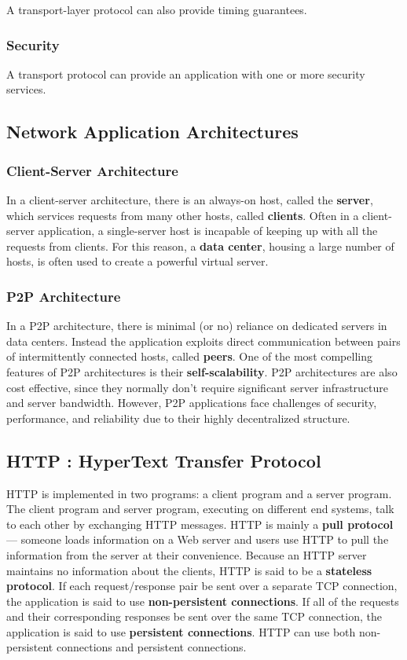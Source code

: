 \documentclass[11pt]{article}
\begin{document}
A transport-layer protocol can also provide timing guarantees.

\subsubsection{Security}

A transport protocol can provide an application with one or more security services.

\subsection{Network Application Architectures}

\subsubsection{Client-Server Architecture}

In a client-server architecture, there is an always-on host, called the \textbf{server}, which services requests from many other hosts, called \textbf{clients}. Often in a client-server application, a single-server host is incapable of keeping up with all the requests from clients. For this reason, a \textbf{data center}, housing a large number of hosts, is often used to create a powerful virtual server. 

\subsubsection{P2P Architecture}

In a P2P architecture, there is minimal (or no) reliance on dedicated servers in data centers. Instead the application exploits direct communication between pairs of intermittently connected hosts, called \textbf{peers}. One of the most compelling features of P2P architectures is their \textbf{self-scalability}. P2P architectures are also cost effective, since they normally don’t require significant server infrastructure and server bandwidth. However, P2P applications face challenges of security, performance, and reliability due to their highly decentralized structure.


\subsection{HTTP : HyperText Transfer Protocol}

HTTP is implemented in two programs: a client program and a server program. The client program and server program, executing on different end systems, talk to each other by exchanging HTTP messages.
HTTP is mainly a \textbf{pull protocol} --- someone loads information on a Web server and users use HTTP to pull the information from the server at their convenience.
Because an HTTP server maintains no information about the clients, HTTP is said to be a \textbf{stateless protocol}.
If each request/response pair be sent over a separate TCP connection, the application is said to use \textbf{non-persistent connections}. If all of the requests and their corresponding responses be sent over the same TCP connection, the application is said to use \textbf{persistent connections}. HTTP can use both non-persistent connections and persistent connections.
\end{document}

